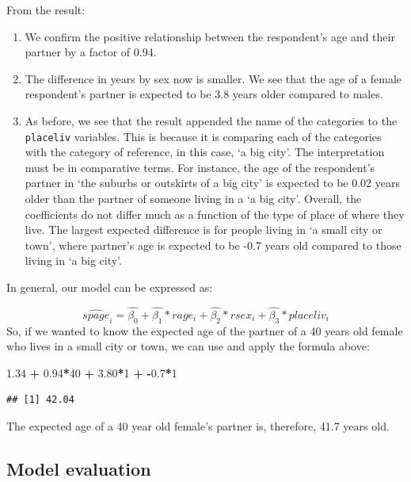 \documentclass[
]{book}
\newenvironment{Shaded}{\begin{snugshade}}{\end{snugshade}}
\newcommand{\DecValTok}[1]{\textcolor[rgb]{0.00,0.00,0.81}{#1}}
\newcommand{\FloatTok}[1]{\textcolor[rgb]{0.00,0.00,0.81}{#1}}
\newcommand{\SpecialCharTok}[1]{\textcolor[rgb]{0.81,0.36,0.00}{\textbf{#1}}}
\providecommand{\tightlist}{%
  \setlength{\itemsep}{0pt}\setlength{\parskip}{0pt}}
\begin{document}
From the result:

\begin{enumerate}
\def\labelenumi{\arabic{enumi}.}
\tightlist
\item
  We confirm the positive relationship between the respondent's age and their partner by a factor of 0.94.
\item
  The difference in years by sex now is smaller. We see that the age of a female respondent's partner is expected to be 3.8 years older compared to males.
\item
  As before, we see that the result appended the name of the categories to the \texttt{placeliv} variables. This is because it is comparing each of the categories with the category of reference, in this case, `a big city'. The interpretation must be in comparative terms. For instance, the age of the respondent's partner in `the suburbs or outskirts of a big city' is expected to be 0.02 years older than the partner of someone living in a `a big city'. Overall, the coefficients do not differ much as a function of the type of place of where they live. The largest expected difference is for people living in `a small city or town', where partner's age is expected to be -0.7 years old compared to those living in `a big city'.
\end{enumerate}

In general, our model can be expressed as:

\[ \hat{spage}_i = \hat{\beta_0} + \hat{\beta_1}*rage_i + \hat{\beta_2}*rsex_i + \hat{\beta_3} *  placeliv_i \]
So, if we wanted to know the expected age of the partner of a 40 years old female who lives in a small city or town, we can use and apply the formula above:

\begin{Shaded}
\begin{Highlighting}[]
\FloatTok{1.34} \SpecialCharTok{+} \FloatTok{0.94}\SpecialCharTok{*}\DecValTok{40} \SpecialCharTok{+} \FloatTok{3.80}\SpecialCharTok{*}\DecValTok{1} \SpecialCharTok{+} \SpecialCharTok{{-}}\FloatTok{0.7}\SpecialCharTok{*}\DecValTok{1}
\end{Highlighting}
\end{Shaded}

\begin{verbatim}
## [1] 42.04
\end{verbatim}

The expected age of a 40 year old female's partner is, therefore, 41.7 years old.

\hypertarget{model-evaluation-1}{%
\subsection{Model evaluation}\label{model-evaluation-1}}
\end{document}
